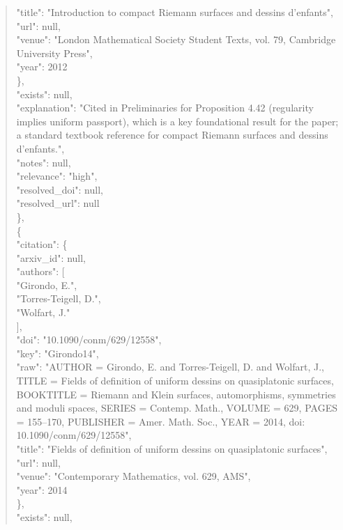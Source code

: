 \documentclass[11pt]{article}
\begin{document}
\begin{quote}
        "title": "Introduction to compact Riemann surfaces and dessins d'enfants",\\
        "url": null,\\
        "venue": "London Mathematical Society Student Texts, vol. 79, Cambridge University Press",\\
        "year": 2012\\
      \},\\
      "exists": null,\\
      "explanation": "Cited in Preliminaries for Proposition 4.42 (regularity implies uniform passport), which is a key foundational result for the paper; a standard textbook reference for compact Riemann surfaces and dessins d'enfants.",\\
      "notes": null,\\
      "relevance": "high",\\
      "resolved\_doi": null,\\
      "resolved\_url": null\\
    \},\\
    \{\\
      "citation": \{\\
        "arxiv\_id": null,\\
        "authors": [\\
          "Girondo, E.",\\
          "Torres-Teigell, D.",\\
          "Wolfart, J."\\
        ],\\
        "doi": "10.1090/conm/629/12558",\\
        "key": "Girondo14",\\
        "raw": "AUTHOR = Girondo, E. and Torres-Teigell, D. and Wolfart, J., TITLE = Fields of definition of uniform dessins on quasiplatonic surfaces, BOOKTITLE = Riemann and Klein surfaces, automorphisms, symmetries and moduli spaces, SERIES = Contemp. Math., VOLUME = 629, PAGES = 155--170, PUBLISHER = Amer. Math. Soc., YEAR = 2014, doi: 10.1090/conm/629/12558",\\
        "title": "Fields of definition of uniform dessins on quasiplatonic surfaces",\\
        "url": null,\\
        "venue": "Contemporary Mathematics, vol. 629, AMS",\\
        "year": 2014\\
      \},\\
      "exists": null,\\

\end{quote}
\end{document}
